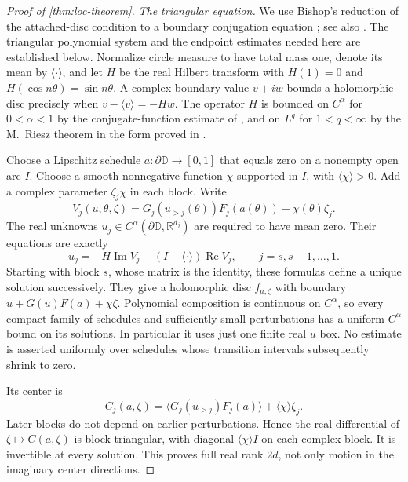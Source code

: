 \begin{proof}[Proof of \cref{thm:loc-theorem}]
\emph{The triangular equation.} We use Bishop's reduction of the attached-disc condition to a boundary conjugation equation \cite{Bishop1965}; see also \cite[\S2, equation~(2.1) and Proposition~2.1]{HillTaiani1978}. The triangular polynomial system and the endpoint estimates needed here are established below. Normalize circle measure to have total mass one, denote its mean by $\langle\cdot\rangle$, and let $H$ be the real Hilbert transform with $H(1)=0$ and $H(\cos n\theta)=\sin n\theta$.  A complex boundary value $v+iw$ bounds a holomorphic disc precisely when $v-\langle v\rangle=-Hw$.  The operator $H$ is bounded on $C^\alpha$ for $0<\alpha<1$ by the conjugate-function estimate of \cite[pp.~100--102]{Priwaloff1916}, and on $L^q$ for $1<q<\infty$ by the M.~Riesz theorem in the form proved in \cite[equation~(0.1) and \S\S1--2]{Essen1984}.

Choose a Lipschitz schedule $a:\partial\mathbb{D}\to[0,1]$ that equals zero on a nonempty open arc $I$.  Choose a smooth nonnegative function $\chi$ supported in $I$, with $\langle\chi\rangle>0$.  Add a complex parameter $\zeta_j\chi$ in each block.  Write
\[
 V_j(u,\theta,\zeta)
     =G_j(u_{>j}(\theta))F_j(a(\theta))+\chi(\theta)\zeta_j.
\]
The real unknowns $u_j\in C^\alpha(\partial\mathbb{D},\mathbb{R}^{d_j})$ are required to have mean zero.  Their equations are exactly
\begin{equation}\label{eq:loc-bishop}
 u_j=-H\operatorname{Im}V_j
       -(I-\langle\cdot\rangle)\operatorname{Re}V_j,
                       \qquad j=s,s-1,\ldots,1.
\end{equation}
Starting with block $s$, whose matrix is the identity, these formulas define a unique solution successively.  They give a holomorphic disc $f_{a,\zeta}$ with boundary $u+G(u)F(a)+\chi\zeta$.  Polynomial composition is continuous on $C^\alpha$, so every compact family of schedules and sufficiently small perturbations has a uniform $C^\alpha$ bound on its solutions.  In particular it uses just one finite real $u$ box.  No estimate is asserted uniformly over schedules whose transition intervals subsequently shrink to zero.

Its center is
\begin{equation}\label{eq:loc-center}
 C_j(a,\zeta)=\langle G_j(u_{>j})F_j(a)\rangle
                       +\langle\chi\rangle\zeta_j.
\end{equation}
Later blocks do not depend on earlier perturbations.  Hence the real differential of $\zeta\mapsto C(a,\zeta)$ is block triangular, with diagonal $\langle\chi\rangle I$ on each complex block.  It is invertible at every solution.  This proves full real rank $2d$, not only motion in the imaginary center directions.


\end{proof}
